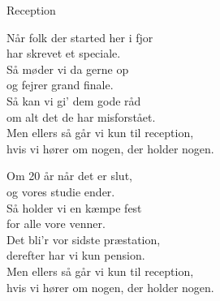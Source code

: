 \begin{song}{Reception}
  \begin{SBVerse}
    Når folk der started her i fjor\\
    har skrevet et speciale.\\
    Så møder vi da gerne op\\
    og fejrer grand finale.\\
    \medskip
    Så kan vi gi’ dem gode råd\\
    om alt det de har misforstået.\\
    \medskip
    Men ellers så går vi kun til reception,\\
    hvis vi hører om nogen, der holder nogen.
  \end{SBVerse}

  \begin{SBVerse}
    Om 20 år når det er slut,\\
    og vores studie ender.\\
    Så holder vi en kæmpe fest\\
    for alle vore venner.\\
    \medskip
    Det bli’r vor sidste præstation,\\
    derefter har vi kun pension.\\
    \medskip
    Men ellers så går vi kun til reception,\\
    hvis vi hører om nogen, der holder nogen.
  \end{SBVerse}
\end{song}
